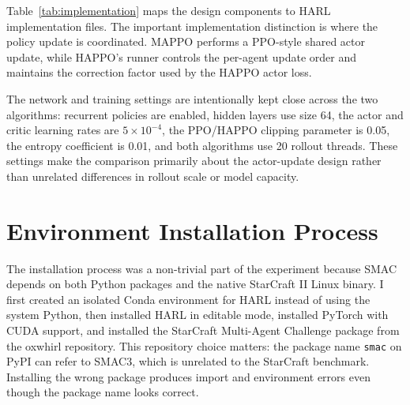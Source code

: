 \documentclass{article}
\begin{document}
Table~\ref{tab:implementation} maps the design components to HARL implementation files. The important implementation distinction is where the policy update is coordinated. MAPPO performs a PPO-style shared actor update, while HAPPO's runner controls the per-agent update order and maintains the correction factor used by the HAPPO actor loss.

\begin{table}[h]
\centering
\caption{Design components and corresponding HARL implementation.}
\label{tab:implementation}
\end{table}

The network and training settings are intentionally kept close across the two algorithms: recurrent policies are enabled, hidden layers use size 64, the actor and critic learning rates are \(5\times 10^{-4}\), the PPO/HAPPO clipping parameter is 0.05, the entropy coefficient is 0.01, and both algorithms use 20 rollout threads. These settings make the comparison primarily about the actor-update design rather than unrelated differences in rollout scale or model capacity.

\section{Environment Installation Process}

The installation process was a non-trivial part of the experiment because SMAC depends on both Python packages and the native StarCraft II Linux binary. I first created an isolated Conda environment for HARL instead of using the system Python, then installed HARL in editable mode, installed PyTorch with CUDA support, and installed the StarCraft Multi-Agent Challenge package from the oxwhirl repository. This repository choice matters: the package name \texttt{smac} on PyPI can refer to SMAC3, which is unrelated to the StarCraft benchmark. Installing the wrong package produces import and environment errors even though the package name looks correct.
\end{document}
